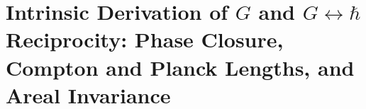 \chapter{Intrinsic Derivation of \(G\) and \(G\leftrightarrow\hbar\) Reciprocity: Phase Closure, Compton and Planck Lengths, and Areal Invariance}
\label{chap:p3-final:50:gravitacion_accion}



